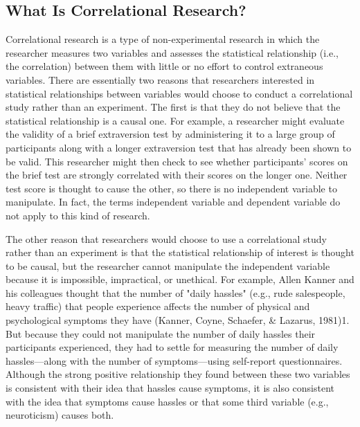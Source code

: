 \subsection{What Is Correlational Research?}

Correlational research is a type of non-experimental research in which the researcher measures two variables and assesses the statistical relationship (i.e., the correlation) between them with little or no effort to control extraneous variables. There are essentially two reasons that researchers interested in statistical relationships between variables would choose to conduct a correlational study rather than an experiment. The first is that they do not believe that the statistical relationship is a causal one. For example, a researcher might evaluate the validity of a brief extraversion test by administering it to a large group of participants along with a longer extraversion test that has already been shown to be valid. This researcher might then check to see whether participants' scores on the brief test are strongly correlated with their scores on the longer one. Neither test score is thought to cause the other, so there is no independent variable to manipulate. In fact, the terms independent variable and dependent variable do not apply to this kind of research.

The other reason that researchers would choose to use a correlational study rather than an experiment is that the statistical relationship of interest is thought to be causal, but the researcher cannot manipulate the independent variable because it is impossible, impractical, or unethical. For example, Allen Kanner and his colleagues thought that the number of "daily hassles" (e.g., rude salespeople, heavy traffic) that people experience affects the number of physical and psychological symptoms they have (Kanner, Coyne, Schaefer, \& Lazarus, 1981)1. But because they could not manipulate the number of daily hassles their participants experienced, they had to settle for measuring the number of daily hassles---along with the number of symptoms---using self-report questionnaires. Although the strong positive relationship they found between these two variables is consistent with their idea that hassles cause symptoms, it is also consistent with the idea that symptoms cause hassles or that some third variable (e.g., neuroticism) causes both.

